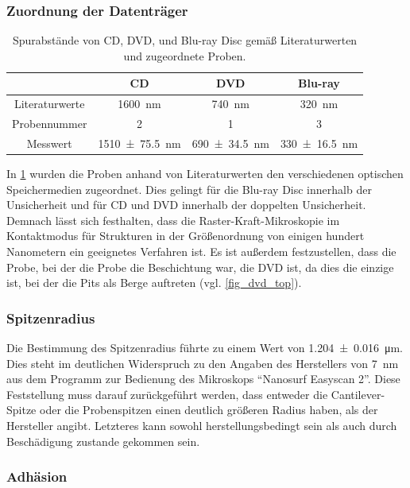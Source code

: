 \documentclass[
	a4paper,
	12pt,
	pagesize,
	ngerman
]{scrartcl}
\begin{document}
	\subsubsection{Zuordnung der Datenträger}
	\begin{table}[H]
		\centering
		\begin{tabular}{ c | c | c | c}
			&CD \cite{CD}&DVD \cite{DVD}&Blu-ray \cite{blu}\\ \hline
			Literaturwerte & \SI{1600}{\nano \meter} & \SI{740}{\nano \meter}& \SI{320}{\nano \meter}\\
			Probennummer & 2 & 1 & 3\\
			Messwert & \SI{1510+-75,5}{\nano \meter} & \SI{690 +-34,5}{\nano \meter} & \SI{330 +- 16,5}{\nano \meter}\\
		\end{tabular}
		\caption{Spurabstände von CD, DVD, und Blu-ray Disc gemäß Literaturwerten und zugeordnete Proben.}
		\label{tb_lit_Spurabstände}
	\end{table}
	In \cref{tb_lit_Spurabstände} wurden die Proben anhand von Literaturwerten den verschiedenen optischen Speichermedien zugeordnet.
	Dies gelingt für die Blu-ray Disc innerhalb der Unsicherheit und für CD und DVD innerhalb der doppelten Unsicherheit.
	Demnach lässt sich festhalten, dass die Raster-Kraft-Mikroskopie im Kontaktmodus für Strukturen in der Größenordnung von einigen hundert Nanometern ein geeignetes Verfahren ist.
	Es ist außerdem festzustellen, dass die Probe, bei der die Probe die Beschichtung war, die DVD ist, da dies die einzige ist, bei der die Pits als Berge auftreten (vgl. \cref{fig_dvd_top}).
	
	\subsubsection{Spitzenradius}
	Die Bestimmung des Spitzenradius führte zu einem Wert von \SI{1,204 +- 0,016}{\micro \meter}.
	Dies steht im deutlichen Widerspruch zu den Angaben des Herstellers von \SI{7}{\nano \meter} aus dem Programm zur Bedienung des Mikroskops \enquote{Nanosurf Easyscan 2}.
	Diese Feststellung muss darauf zurückgeführt werden, dass entweder die Cantilever-Spitze oder die Probenspitzen einen deutlich größeren Radius haben, als der Hersteller angibt.
	Letzteres kann sowohl herstellungsbedingt sein als auch durch Beschädigung zustande gekommen sein.
	\subsubsection{Adhäsion}
\end{document}
